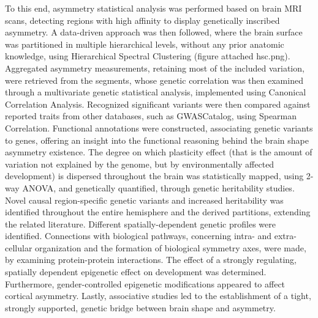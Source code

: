\begin{popsum}
To this end, asymmetry statistical analysis was performed based on brain MRI scans, detecting regions with high affinity to display genetically inscribed asymmetry. A data-driven approach was then followed, where the brain surface was partitioned in multiple hierarchical levels, without any prior anatomic knowledge, using Hierarchical Spectral Clustering (figure attached hsc.png). Aggregated asymmetry measurements, retaining most of the included variation, were retrieved from the segments, whose genetic correlation was then examined through a multivariate genetic statistical analysis, implemented using Canonical Correlation Analysis. Recognized significant variants were then compared against reported traits from other databases, such as GWASCatalog, using Spearman Correlation.  Functional annotations were constructed,  associating genetic variants to genes, offering an insight into the functional reasoning behind the brain shape asymmetry existence. The degree on which plasticity effect (that is the amount of variation not explained by the genome, but by  environmentally affected development) is dispersed throughout the brain was statistically mapped, using 2-way ANOVA, and genetically quantified, through genetic heritability studies. Novel causal region-specific genetic variants and increased heritability was identified throughout the entire hemisphere and the derived partitions, extending the related literature. Different spatially-dependent genetic profiles were identified. Connections with biological pathways, concerning intra- and extra-cellular organization and the formation of biological symmetry axes, were made, by examining protein-protein interactions. The effect of a strongly regulating, spatially dependent epigenetic effect on development was determined. Furthermore, gender-controlled epigenetic modifications appeared to affect cortical asymmetry. Lastly, associative studies led to the establishment of a tight, strongly supported, genetic bridge between  brain shape and asymmetry.
\end{popsum}